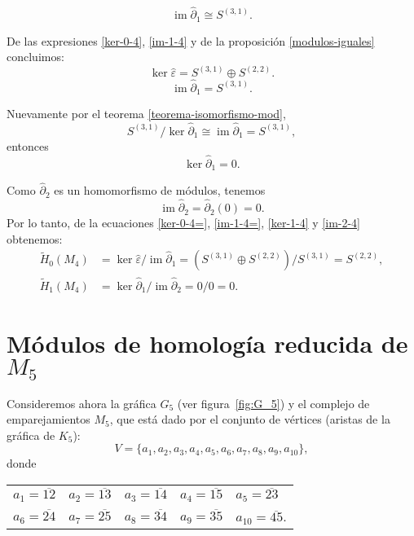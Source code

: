 \documentclass[12pt]{book}
\theoremstyle{definition}
\DeclareMathOperator{\im}{im}
\newcounter{in}
\begin{document}
\begin{equation}
  \label{im-1-4}
  \im\widehat\partial_{1}\cong S^{(3,1)}.
\end{equation}

De las expresiones \ref{ker-0-4}, \ref{im-1-4} y de la
proposición \ref{modulos-iguales} concluimos:
\begin{equation}
  \label{ker-0-4=}
  \ker\widehat\varepsilon=S^{(3,1)}\oplus S^{(2,2)}.
\end{equation}
\begin{equation}
\label{im-1-4=}
\im\widehat\partial_{1}=S^{(3,1)}.
\end{equation}

Nuevamente por el teorema \ref{teorema-isomorfismo-mod},
$$S^{(3,1)}/\ker\widehat\partial_{1}\cong\im\widehat\partial_{1}= S^{(3,1)},$$
entonces
\begin{equation}
  \ker\widehat\partial_{1}=0.
  \label{ker-1-4}
\end{equation}

Como $\widehat\partial_{2}$ es un homomorfismo de módulos, tenemos
\begin{equation}
  \im\widehat\partial_{2}=\widehat\partial_{2}(0)=0.
  \label{im-2-4}
\end{equation}
Por lo tanto, de la ecuaciones \ref{ker-0-4=}, \ref{im-1-4=},
\ref{ker-1-4} y \ref{im-2-4} obtenemos:
\begin{align*}
\widetilde H_{0}(M_{4})&=\ker \widehat\varepsilon/\im
\widehat\partial_{1}=(S^{(3,1)}\oplus S^{(2,2)})/S^{(3,1)}=S^{(2,2)},\\
\widetilde H_{1}(M_{4})&=\ker \widehat\partial_{1}/\im \widehat\partial_{2}=0/0=0.
\end{align*}

\section{Módulos de homología reducida de $M_{5}$}
\label{hom-red-M5}

Consideremos ahora la gráfica $G_{5}$ (ver figura~\ref{fig:G_5}) y el complejo de emparejamientos $M_{5}$, que
está dado por el conjunto de vértices (aristas de la gráfica de $K_{5}$):
$$V=\{a_{1},a_{2},a_{3},a_{4},a_{5},a_{6},a_{7},a_{8},a_{9},a_{10}\},$$
donde
\begin{table}[!hbtp]
  \centering
  \begin{tabular}{lllll}
    $a_{1}=\overline{12}$ & $a_{2}=\overline{13}$ & $a_{3}=\overline{14}$ & $a_{4}=\overline{15}$ & $a_{5}=\overline{23}$ \\
    $a_{6}=\overline{24}$ & $a_{7}=\overline{25}$ & $a_{8}=\overline{34}$ & $a_{9}=\overline{35}$ & $a_{10}=\overline{45}$.
  \end{tabular}
\end{table}
\end{document}
